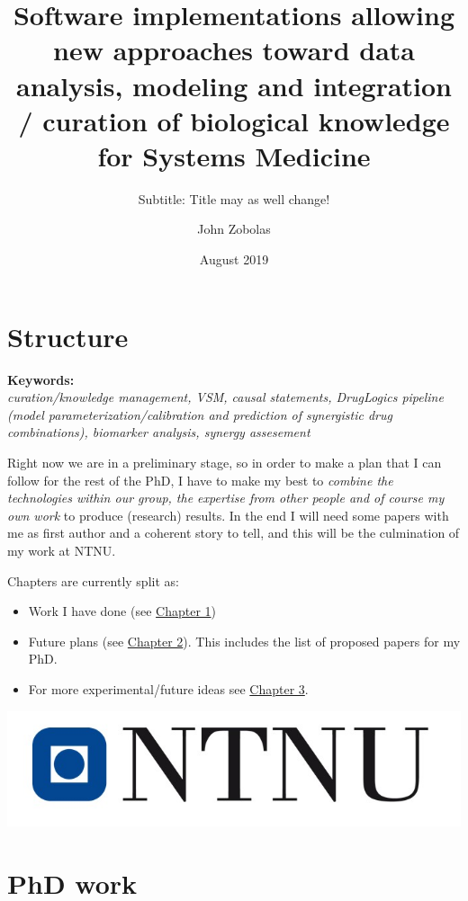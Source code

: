 \documentclass[12pt,]{book}
\title{Software implementations allowing new approaches toward data analysis, modeling and integration / curation of biological knowledge for Systems Medicine}
\subtitle{Subtitle: Title may as well change!}
\author{John Zobolas}
\date{August 2019}
\providecommand{\tightlist}{%
  \setlength{\itemsep}{0pt}\setlength{\parskip}{0pt}}
\begin{document}
\maketitle

{
\hypersetup{linkcolor=black}
\setcounter{tocdepth}{1}
\tableofcontents
}
\listoftables
\listoffigures
\hypertarget{structure}{%
\chapter*{Structure}\label{structure}}

\textbf{Keywords:}\\
\emph{curation/knowledge management, VSM, causal statements, DrugLogics pipeline
(model parameterization/calibration and prediction of synergistic drug combinations),
biomarker analysis, synergy assesement}

Right now we are in a preliminary stage, so in order to make a plan that I can
follow for the rest of the PhD, I have to make my best to \emph{combine the technologies
within our group, the expertise from other people and of course my own work} to
produce (research) results. In the end I will need some papers with me as first
author and a coherent story to tell, and this will be the culmination of my work
at NTNU.

Chapters are currently split as:

\begin{itemize}
\tightlist
\item
  Work I have done (see \protect\hyperlink{work}{Chapter 1})
\item
  Future plans (see \protect\hyperlink{plans}{Chapter 2}). This includes the list of
  proposed papers for my PhD.
\item
  For more experimental/future ideas see \protect\hyperlink{ideas}{Chapter 3}.
\end{itemize}

\begin{center}\includegraphics[width=0.5\linewidth]{img/NTNU-logo} \end{center}

\hypertarget{work}{%
\chapter{PhD work}\label{work}}
\end{document}
